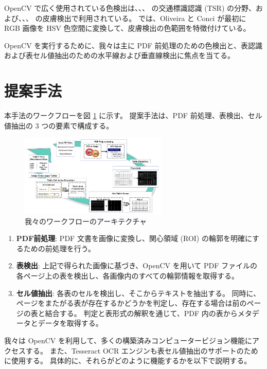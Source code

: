 \documentclass[uplatex, twocolumn,10pt]{jsarticle}
\begin{document}
OpenCV で広く使用されている色検出は、\cite{bib18}、\cite{bib19}、\cite{bib20} の交通標識認識 (TSR) の分野、および、\cite{bib21}、\cite{bib22}、\cite{bib23} の皮膚検出で利用されている。
\cite{bib21} では、Oliveira と Conci が最初に RGB 画像を HSV 色空間に変換して、皮膚検出の色範囲を特徴付けている。

OpenCV を実行するために、我々は主に PDF 前処理のための色検出と、表認識および表セル値抽出のための水平線および垂直線検出に焦点を当てる。


\section{提案手法}
本手法のワークフローを図 \ref{fig1} に示す。
提案手法は、PDF 前処理、表検出、セル値抽出の 3 つの要素で構成する。

\begin{figure}[tp]
    \begin{center}
        \includegraphics*[width=7cm]{image/master/master2/Fig1.png}
        \caption{我々のワークフローのアーキテクチャ}
        \label{fig1}
    \end{center}
\end{figure}

\begin{enumerate}
    \item \textbf{PDF前処理}:
    PDF 文書を画像に変換し、関心領域 (ROI) の輪郭を明確にするための前処理を行う。
    \item \textbf{表検出}:
    上記で得られた画像に基づき、OpenCV を用いて PDF ファイルの各ページ上の表を検出し、各画像内のすべての輪郭情報を取得する。
    \item \textbf{セル値抽出}:
    各表のセルを検出し、そこからテキストを抽出する。
    同時に、ページをまたがる表が存在するかどうかを判定し、存在する場合は前のページの表と結合する。
    判定と表形式の解釈を通じて、PDF 内の表からメタデータとデータを取得する。
\end{enumerate}

我々は OpenCV を利用して、多くの構築済みコンピュータービジョン機能にアクセスする。
また、Tesseract OCR エンジンも表セル値抽出のサポートのために使用する。
具体的に、それらがどのように機能するかを以下で説明する。
\end{document}
